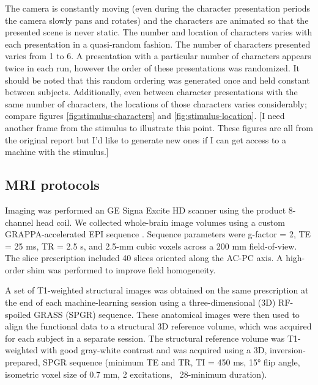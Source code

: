 \documentclass[preprint,5p,authoryear]{elsarticle}
\begin{document}
The camera is constantly moving (even during the character presentation periods the camera slowly pans and rotates) and the characters are animated so that the presented scene is never static.
The number and location of characters varies with each presentation in a quasi-random fashion.
The number of characters presented varies from 1 to 6.
A presentation with a particular number of characters appears twice in each run, however the order of these presentations was randomized.
It should be noted that this random ordering was generated once and held constant between subjects.
Additionally, even between character presentations with the same number of characters, the locations of those characters varies considerably; compare figures \ref{fig:stimulus-characters} and \ref{fig:stimulus-location}.
[I need another frame from the stimulus to illustrate this point. These figures are all from the original report but I'd like to generate new ones if I can get access to a machine with the stimulus.]


\subsection{MRI protocols}
Imaging was performed an GE Signa Excite HD scanner using the product 8-channel head coil.
We collected whole-brain image volumes using a custom GRAPPA-accelerated EPI sequence \citep{newbold}. 
Sequence parameters were g-factor = 2,  TE = 25 ms, TR = 2.5 s, and  2.5-mm cubic voxels across a 200 mm field-of-view. 
The slice prescription included 40 slices oriented along the AC-PC axis. 
A high-order shim was  performed to improve field homogeneity.

A set of T1-weighted structural images was obtained on the same prescription at the end of each machine-learning session using a three-dimensional (3D) RF-spoiled GRASS (SPGR) sequence. 
These anatomical images were then used to align the functional data to a structural 3D reference volume, which was acquired for each subject in a separate session. 
The structural reference volume was T1-weighted with good gray-white contrast and was acquired using a 3D, inversion-prepared, SPGR sequence (minimum TE and TR, TI = 450 ms, 15° flip angle, isometric voxel size of 0.7 mm, 2 excitations, ~28-minimum duration).
\end{document}
